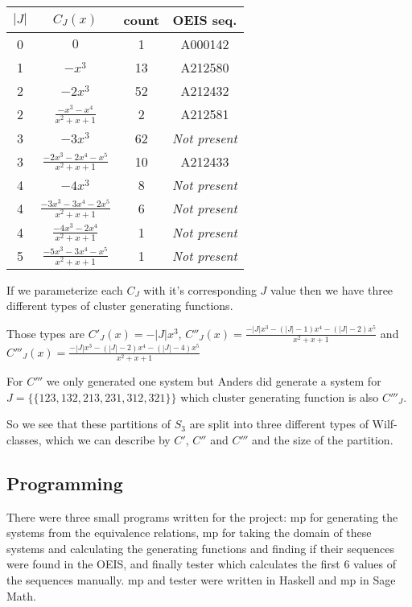 \documentclass[a4paper, 11pt, english]{article}
\theoremstyle{definition}
\newcommand{\Sym}{S}
\begin{document}
\begin{center}
\begin{tabular}{c|c|c|c}
    $|J|$ & $C_J(x)$ & count & OEIS seq. \\
    \hline
    0 & $0$ & 1 & A000142 \\
    1 & $-x^3$ & 13 & A212580 \\
    2 & $-2x^3$ & 52 & A212432 \\
    2 & $\frac{-x^3-x^4}{x^2+x+1}$ & 2 & A212581 \\
    3 & $-3x^3$ & 62 & \emph{Not present} \\
    3 & $\frac{-2x^3-2x^4-x^5}{x^2+x+1}$ & 10 & A212433 \\
    4 & $-4x^3$ & 8 & \emph{Not present} \\
    4 & $\frac{-3x^3-3x^4-2x^5}{x^2+x+1}$ & 6 & \emph{Not present}\\
    4 & $\frac{-4x^3-2x^4}{x^2+x+1}$ & 1 & \emph{Not present} \\ 
    \hline
    \hline
    5 & $\frac{-5x^3-3x^4-x^5}{x^2+x+1}$ & 1 & \emph{Not present} \\ 
\end{tabular}
\end{center}

If we parameterize each $C_J$ with it's corresponding $J$ value then we have
three different types of cluster generating functions.

Those types are $C'_J(x) = -|J|x^3$, $C''_J(x) = \frac{-|J|x^3-(|J|-1)x^4-(|J|-2)x^5}{x^2+x+1}$
and $C'''_J(x) = \frac{-|J|x^3-(|J|-2)x^4-(|J|-4)x^5}{x^2+x+1}$

For $C'''$ we only generated one system but Anders did generate a system for
$J = \{\{ 123, 132, 213, 231, 312, 321 \}\}$ which cluster generating function
is also $C'''_J$.

So we see that these partitions of $\Sym_3$ are split into three different types
of Wilf-classes, which we can describe by $C'$, $C''$ and $C'''$ and the size
of the partition.

\subsection{Programming}
There were three small programs written for the project: mp for generating the
systems from the equivalence relations, mp for taking the domain of these
systems and calculating the generating functions and finding if their sequences
were found in the OEIS, and finally tester which calculates the first 6 values
of the sequences manually. mp and tester were written in Haskell and mp in Sage Math. 
\end{document}
